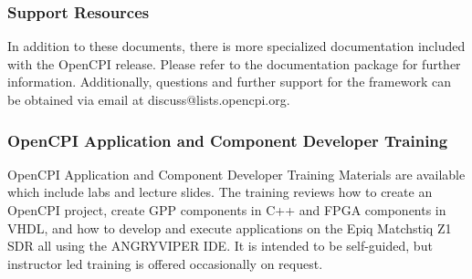 \subsubsection*{Support Resources}
In addition to these documents, there is more specialized documentation included with the OpenCPI release. Please refer to the documentation package for further information. Additionally, questions and further support for the framework can be obtained via email at discuss@lists.opencpi.org.
\subsubsection*{OpenCPI Application and Component Developer Training}
OpenCPI Application and Component Developer Training Materials are available which include labs and lecture slides. The training reviews how to create an OpenCPI project, create GPP components in C++ and FPGA components in VHDL, and how to develop and execute applications on the Epiq Matchstiq Z1 SDR all using the ANGRYVIPER IDE. It is intended to be self-guided, but instructor led training is offered occasionally on request.\par\bigskip

